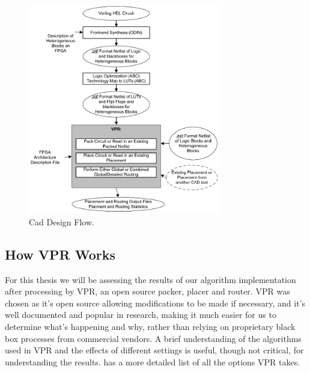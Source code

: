 \documentclass[12pt,drafta4paper,oneside]{memoir} %
\begin{document}
\begin{figure}
    \begin{center}
        \includegraphics[width=0.75\textwidth]{images/vpr-cad.png}
        \caption{Cad Design Flow.\cite{VPRManual}}
        \label{CADFlow}
    \end{center}
\end{figure}
\subsection{How \acs{VPR} Works}
For this thesis we will be assessing the results of our algorithm implementation after processing by \ac{VPR}, an open source packer, placer and router. \ac{VPR} was chosen as it's open source allowing modifications to be made if necessary, and it's well documented and popular in research, making it much easier for us to determine what's happening and why, rather than relying on proprietary black box processes from commercial vendors.
A brief understanding of the algorithms used in \ac{VPR} and the effects of different settings is useful, though not critical, for understanding the results. \cite{VPRManual} has a more detailed list of all the options \ac{VPR} takes.
\end{document}
